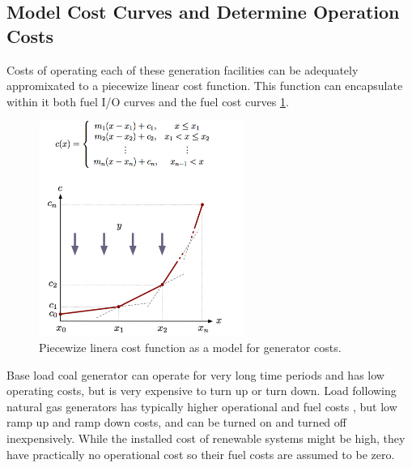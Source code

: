 \documentclass[a4paper]{article}
\begin{document}
\subsection{Model Cost Curves and Determine Operation Costs}
 



Costs of operating each of these generation facilities can be adequately appromixated to a piecewize linear cost function. This function can encapsulate within it both fuel I/O curves and the fuel cost curves \ref{fig:Costs}.

\begin{figure}[h!]
\centering
\includegraphics[width=0.6\textwidth]{Costs.png}
\caption{\label{fig:Costs}Piecewize linera cost function as a model for generator costs.}
\end{figure}

Base load coal generator can operate for very long time periods and has low operating costs, but is very expensive to turn up or turn down. Load following natural gas generators has typically higher operational and fuel costs , but low ramp up and ramp down costs, and can be turned on and turned off inexpensively. While the installed cost of renewable systems might be high, they have practically no operational cost so their fuel costs are assumed to be zero. 
\end{document}

